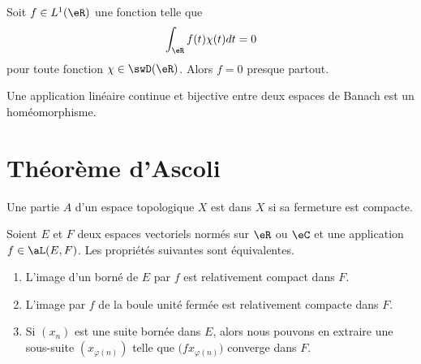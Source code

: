 
\begin{proposition} \label{PropAAjSURG}
    Soit \( f\in L^1(\eR)\) une fonction telle que
    \begin{equation}
        \int_{\eR}f(t)\chi(t)dt=0
    \end{equation}
    pour toute fonction \( \chi\in\swD(\eR)\). Alors \( f=0\) presque partout.
\end{proposition}

\begin{theorem}  \label{ThofQShsw}
    Une application linéaire continue et bijective entre deux espaces de Banach est un homéomorphisme.
\end{theorem}

\section{Théorème d'Ascoli}

\begin{definition}
    Une partie \( A\) d'un espace topologique \( X\) est  dans \( X\) si sa fermeture est compacte.
\end{definition}

\begin{proposition} \label{PropDGsPtpU}
    Soient \( E\) et \( F\) deux espaces vectoriels normés sur \( \eR\) ou \( \eC\) et une application \( f\in\aL(E,F)\). Les propriétés suivantes sont équivalentes.
    \begin{enumerate}
        \item
            L'image d'un borné de \( E\) par \( f\) est relativement compact dans \( F\).
        \item   \label{ItemJIkpUbLii}
            L'image par \( f\) de la boule unité fermée est relativement compacte dans \( F\).
        \item
            Si \( (x_n)\) est une suite bornée dans \( E\), alors nous pouvons en extraire une sous-suite \( (x_{\varphi(n)})\) telle que \( \big( fx_{\varphi(n)} \big)\) converge dans \( F\).
    \end{enumerate}
\end{proposition}

